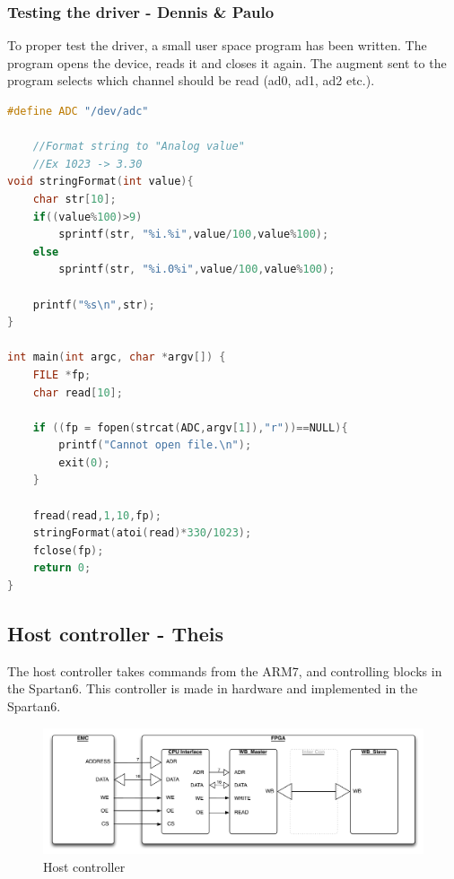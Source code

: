\subsubsection{Testing the driver - Dennis \& Paulo}
To proper test the driver, a small user space program has been written. The program opens the device, reads it and closes it again.
The augment sent to the program selects which channel should be read (ad0, ad1, ad2 etc.).

\begin{lstlisting}[language=c]
#define ADC "/dev/adc"
	
	//Format string to "Analog value"
	//Ex 1023 -> 3.30
void stringFormat(int value){
	char str[10];
	if((value%100)>9)
		sprintf(str, "%i.%i",value/100,value%100);
 	else
 		sprintf(str, "%i.0%i",value/100,value%100);
 		
	printf("%s\n",str);
}

int main(int argc, char *argv[]) {
	FILE *fp;
	char read[10];

	if ((fp = fopen(strcat(ADC,argv[1]),"r"))==NULL){
		printf("Cannot open file.\n");
		exit(0);
	}
	
	fread(read,1,10,fp);
	stringFormat(atoi(read)*330/1023);
	fclose(fp);
	return 0;
}
\end{lstlisting}

\subsection{Host controller - Theis}
The host controller takes commands from the ARM7, and controlling blocks in the Spartan6. This controller is made in hardware and implemented in the Spartan6.
\begin{figure}[H]
	\begin{centering}
		 \includegraphics[width=1.0\textwidth]{images/host_controller.pdf}
		\caption{Host controller}
	\end{centering}
\end{figure}
